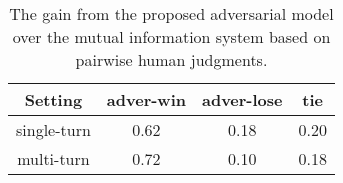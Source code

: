\begin{table}
\small
\centering
\begin{tabular}{cccc}\\\toprule
Setting &adver-win &adver-lose &tie\\\midrule
single-turn& 0.62& 0.18 &0.20 \\
multi-turn& 0.72 &0.10& 0.18\\\bottomrule
\end{tabular}
\caption{The gain
from the proposed adversarial model
 over the mutual information system
based on pairwise human judgments.}
\label{human}
\end{table}

\begin{comment}
\begin{table}
\centering
\small
\begin{tabular}{l}\toprule
{\bf Input}: {Do you love me?} (1) \\\midrule
{\it Mutual information reranking} \\ 
{Yes, of course}. (2)\\
 {I love you too.} (3)\\
{Goodbye, honey}. (4) \\\midrule
{\it Adversarial training} \\
More than anything in this world. (2) \\
Then we can stay together, you and me. (3) \\
Yes, we can. (4) \\\hline
{\bf Input}: {Where are you going?} (1) \\\midrule
{\it Mutual information reranking} \\ 
I am going to the restroom. (2) \\
See you later. (3) \\
See you later. (4)\\\midrule
{\it Adversarial training} \\
I'm going to join the Army. (2)\\
 You're joking! (3)\\
 No I'm not. (4)\\\bottomrule
\end{tabular}	
\caption{
Multi-turn dialogue simulation. The first turn (index 1) is input by the authors. Then the two agents take turns conversing, taking as input the other agent's prior generated turn.}
\label{multi}
\end{table}
\end{comment}


